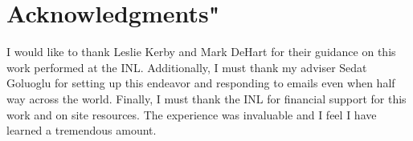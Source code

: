 \documentclass[11pt]{article}
\begin{document}
\section{Acknowledgments"}
I would like to thank Leslie Kerby and Mark DeHart for their guidance on this work performed at the INL.  Additionally, I must thank my adviser Sedat Goluoglu for setting up this endeavor and responding to emails even when half way across the world.  
Finally, I must thank the INL for financial support for this work and on site resources.  The experience was invaluable and I feel I have learned a tremendous amount.



\end{document}

